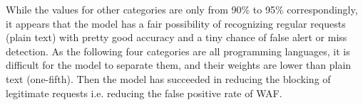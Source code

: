 While the values for other categories are only from 90\% to 95\% correspondingly, it appears that the model has a fair possibility of recognizing regular requests (plain text) with pretty good accuracy and a tiny chance of false alert or miss detection. As the following four categories are all programming languages, it is difficult for the model to separate them, and their weights are lower than plain text (one-fifth). Then the model has succeeded in reducing the blocking of legitimate requests i.e. reducing the false positive rate of WAF. 


